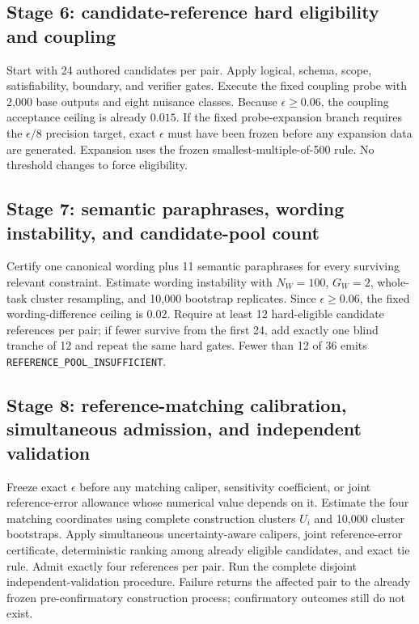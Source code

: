 \documentclass[11pt,a4paper]{article}
\newcommand{\REFPOOL}{\nolinkurl{REFERENCE_POOL_INSUFFICIENT}}
\begin{document}
\subsection{Stage 6: candidate-reference hard eligibility and coupling}
Start with 24 authored candidates per pair. Apply logical, schema, scope, satisfiability, boundary, and verifier gates. Execute the fixed coupling probe with 2,000 base outputs and eight nuisance classes. Because $\epsilon\ge0.06$, the coupling acceptance ceiling is already $0.015$. If the fixed probe-expansion branch requires the $\epsilon/8$ precision target, exact $\epsilon$ must have been frozen before any expansion data are generated. Expansion uses the frozen smallest-multiple-of-500 rule. No threshold changes to force eligibility.

\subsection{Stage 7: semantic paraphrases, wording instability, and candidate-pool count}
Certify one canonical wording plus 11 semantic paraphrases for every surviving relevant constraint. Estimate wording instability with $N_W=100$, $G_W=2$, whole-task cluster resampling, and 10,000 bootstrap replicates. Since $\epsilon\ge0.06$, the fixed wording-difference ceiling is $0.02$. Require at least 12 hard-eligible candidate references per pair; if fewer survive from the first 24, add exactly one blind tranche of 12 and repeat the same hard gates. Fewer than 12 of 36 emits \REFPOOL{}.

\subsection{Stage 8: reference-matching calibration, simultaneous admission, and independent validation}
Freeze exact $\epsilon$ before any matching caliper, sensitivity coefficient, or joint reference-error allowance whose numerical value depends on it. Estimate the four matching coordinates using complete construction clusters $U_i$ and 10,000 cluster bootstraps. Apply simultaneous uncertainty-aware calipers, joint reference-error certificate, deterministic ranking among already eligible candidates, and exact tie rule. Admit exactly four references per pair. Run the complete disjoint independent-validation procedure. Failure returns the affected pair to the already frozen pre-confirmatory construction process; confirmatory outcomes still do not exist.
\end{document}
